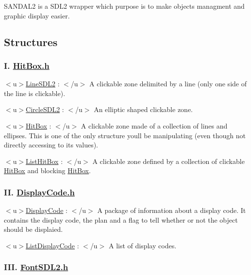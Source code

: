 S\+A\+N\+D\+A\+L2 is a S\+D\+L2 wrapper which purpose is to make objects managment and graphic display easier.

\subsection*{Structures}

\subsubsection*{I. \hyperlink{HitBox_8h}{Hit\+Box.\+h}}


\begin{DoxyEnumerate}
\item $<$u$>$\hyperlink{structLineSDL2}{Line\+S\+D\+L2} \+: $<$/u$>$ A clickable zone delimited by a line (only one side of the line is clickable).
\item $<$u$>$\hyperlink{structCircleSDL2}{Circle\+S\+D\+L2} \+: $<$/u$>$ An elliptic shaped clickable zone.
\item $<$u$>$\hyperlink{structHitBox}{Hit\+Box} \+: $<$/u$>$ A clickable zone made of a collection of lines and ellipses. This is one of the only structure you\textquotesingle{}ll be manipulating (even though not directly accessing to its values).
\item $<$u$>$\hyperlink{structListHitBox}{List\+Hit\+Box} \+: $<$/u$>$ A clickable zone defined by a collection of clickable \hyperlink{structHitBox}{Hit\+Box} and blocking \hyperlink{structHitBox}{Hit\+Box}.
\end{DoxyEnumerate}

\subsubsection*{II. \hyperlink{DisplayCode_8h}{Display\+Code.\+h}}


\begin{DoxyEnumerate}
\item $<$u$>$\hyperlink{structDisplayCode}{Display\+Code} \+: $<$/u$>$ A package of information about a display code. It contains the display code, the plan and a flag to tell whether or not the object should be displaied.
\item $<$u$>$\hyperlink{structListDisplayCode}{List\+Display\+Code} \+: $<$/u$>$ A list of display codes.
\end{DoxyEnumerate}

\subsubsection*{I\+II. \hyperlink{FontSDL2_8h}{Font\+S\+D\+L2.\+h}}


